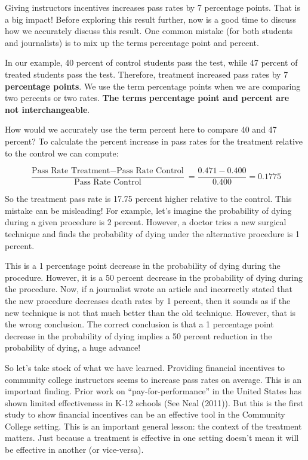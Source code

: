 \documentclass[
]{book}
\begin{document}
Giving instructors incentives increases pass rates by 7 percentage points. That is a big impact! Before exploring this result further, now is a good time to discuss how we accurately discuss this result. One common mistake (for both students and journalists) is to mix up the terms percentage point and percent.

In our example, 40 percent of control students pass the test, while 47 percent of treated students pass the test. Therefore, treatment increased pass rates by 7 \textbf{percentage points}. We use the term percentage points when we are comparing two percents or two rates. \textbf{The terms percentage point and percent are not interchangeable}.

How would we accurately use the term percent here to compare 40 and 47 percent? To calculate the percent increase in pass rates for the treatment relative to the control we can compute:

\[
\frac{\text{Pass Rate Treatment}-\text{Pass Rate Control}}{\text{Pass Rate Control}}= \frac{0.471-0.400}{0.400}=0.1775
\]

So the treatment pass rate is 17.75 percent higher relative to the control. This mistake can be misleading! For example, let's imagine the probability of dying during a given procedure is 2 percent. However, a doctor tries a new surgical technique and finds the probability of dying under the alternative procedure is 1 percent.

This is a 1 percentage point decrease in the probability of dying during the procedure. However, it is a 50 percent decrease in the probability of dying during the procedure. Now, if a journalist wrote an article and incorrectly stated that the new procedure decreases death rates by 1 percent, then it sounds as if the new technique is not that much better than the old technique. However, that is the wrong conclusion. The correct conclusion is that a 1 percentage point decrease in the probability of dying implies a 50 percent reduction in the probability of dying, a huge advance!

So let's take stock of what we have learned. Providing financial incentives to community college instructors seems to increase pass rates on average. This is an important finding. Prior work on ``pay-for-performance'' in the United States has shown limited effectiveness in K-12 schools (See Neal (2011)). But this is the first study to show financial incentives can be an effective tool in the Community College setting. This is an important general lesson: the context of the treatment matters. Just because a treatment is effective in one setting doesn't mean it will be effective in another (or vice-versa).
\end{document}
